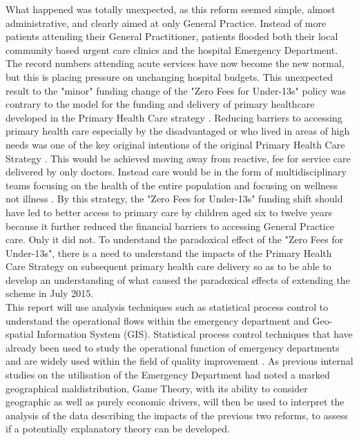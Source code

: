 \documentclass[11pt,a4paper]{article}
\begin{document}
What happened was totally unexpected, as this reform seemed simple, almost administrative, and clearly aimed at only General Practice. Instead of more patients attending their General Practitioner, patients flooded both their local community based urgent care clinics and the hospital Emergency Department. The record numbers attending acute services have now become the new normal, but this is placing pressure on unchanging hospital budgets. This unexpected result to the "minor" funding change of the "Zero Fees for Under-13s" policy was contrary to the model for the funding and delivery of primary healthcare developed in the Primary Health Care strategy \citep{king2001primary}. Reducing barriers to accessing primary health care especially by the disadvantaged or who lived in areas of high needs was one of the key original intentions of the original Primary Health Care Strategy \citep{king2001primary}. This would be achieved moving away from reactive, fee for service care delivered by only doctors. Instead care would be in the form of multidisciplinary teams focusing on the health of the entire population and focusing on wellness not illness \citep{king2001primary}. By this strategy, the "Zero Fees for Under-13s" funding shift should have led to better access to primary care by children aged six to twelve years because it further reduced the financial barriers to accessing General Practice care. Only it did not. To understand the paradoxical effect of the "Zero Fees for Under-13s", there is a need to understand the impacts of the Primary Health Care Strategy on subsequent primary health care delivery so as to be able to develop an understanding of what caused the paradoxical effects of extending the scheme in July 2015.\\

This report will use analysis techniques such as statistical process control to understand the operational flows within the emergency department \citep{rosemann2015six, cheng2015run, epprecht2015statistical} and Geo-spatial Information System (GIS). Statistical process control techniques that have already been used to study the operational function of emergency departments \citep{pimentel2015statistical} and are widely used within the field of quality improvement \citep{provost2011health}. As previous internal studies on the utilisation of the Emergency Department had noted a marked geographical maldistribution, Game Theory, with its ability to consider geographic as well as purely economic drivers, will then be used to interpret the analysis of the data describing the impacts of the previous two reforms, to assess if a potentially explanatory theory can be developed. \\
\end{document}
